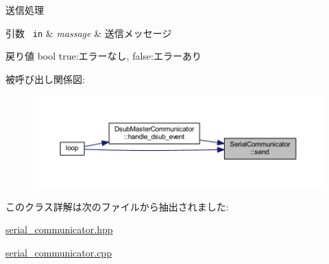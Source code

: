 送信処理 


\begin{DoxyParams}[1]{引数}
\mbox{\texttt{ in}}  & {\em massage} & 送信メッセージ \\
\hline
\end{DoxyParams}
\begin{DoxyReturn}{戻り値}
bool true\+:エラーなし, false\+:エラーあり 
\end{DoxyReturn}
被呼び出し関係図\+:
\nopagebreak
\begin{figure}[H]
\begin{center}
\leavevmode
\includegraphics[width=350pt]{class_serial_communicator_add5f2442d225ecc542f4b8c58a970281_icgraph}
\end{center}
\end{figure}


このクラス詳解は次のファイルから抽出されました\+:\begin{DoxyCompactItemize}
\item 
\mbox{\hyperlink{serial__communicator_8hpp}{serial\+\_\+communicator.\+hpp}}\item 
\mbox{\hyperlink{serial__communicator_8cpp}{serial\+\_\+communicator.\+cpp}}\end{DoxyCompactItemize}
